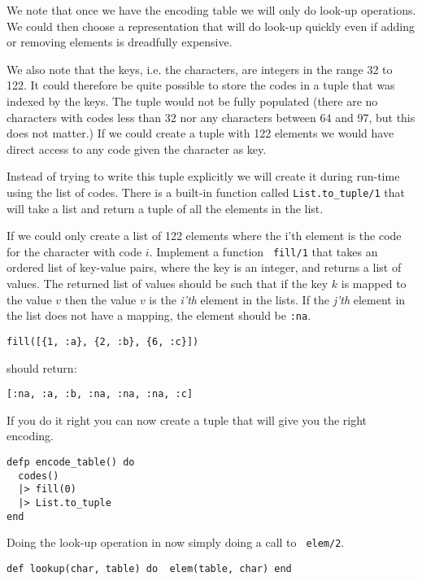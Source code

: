 \documentclass[a4paper,11pt]{article}
\begin{document}
We note that once we have the encoding table we will only do look-up
operations. We could then choose a representation that will do look-up
quickly even if adding or removing elements is dreadfully expensive.

We also note that the keys, i.e. the characters, are integers in the
range 32 to 122. It could therefore be quite possible to store the
codes in a tuple that was indexed by the keys. The tuple would not be
fully populated (there are no characters with codes less than 32 nor
any characters between 64 and 97, but this does not matter.) If we
could create a tuple with 122 elements we would have direct access to
any code given the character as key.

Instead of trying to write this tuple explicitly we will create it
during run-time using the list of codes. There is a built-in function
called {\tt List.to\_tuple/1} that will take a list and return a
tuple of all the elements in the list.

If we could only create a list of 122 elements where the i'th element
is the code for the character with code $i$. Implement a function {\tt
  fill/1} that takes an ordered list of key-value pairs, where the
key is an integer, and returns a list of values. The returned list of
values should be such that if the key $k$ is mapped to the value $v$
then the value $v$ is the {\em i'th} element in the lists. If the {\em
  j'th} element in the list does not have a mapping, the element
should be {\tt :na}.

\begin{verbatim}
fill([{1, :a}, {2, :b}, {6, :c}])
\end{verbatim}

should return:

\begin{verbatim}
[:na, :a, :b, :na, :na, :na, :c]
\end{verbatim}

If you do it right you can now create a tuple that will give you the
right encoding.

\begin{verbatim}
defp encode_table() do
  codes()
  |> fill(0)
  |> List.to_tuple
end
\end{verbatim}

Doing the look-up operation in now simply doing a call to {\tt
  elem/2}.
  
\begin{verbatim}
def lookup(char, table) do  elem(table, char) end
\end{verbatim}
\end{document}
